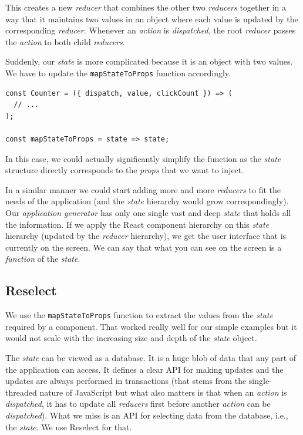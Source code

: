 This creates a new \emph{reducer} that combines the other two \emph{reducers} together in a way that it maintains two values in an object where each value is updated by the corresponding \emph{reducer}. Whenever an \emph{action} is \emph{dispatched}, the root \emph{reducer} passes the \emph{action} to both child \emph{reducers}.

Suddenly, our \emph{state} is more complicated because it is an object with two values. We have to update the \texttt{mapStateToProps} function accordingly.

\begin{verbatim}
const Counter = ({ dispatch, value, clickCount }) => (
  // ...
);

const mapStateToProps = state => state;
\end{verbatim}

In this case, we could actually significantly simplify the function as the \emph{state} structure directly corresponds to the \emph{props} that we want to inject.

In a similar manner we could start adding more and more \emph{reducers} to fit the needs of the application (and the \emph{state} hierarchy would grow correspondingly). Our \emph{application generator} has only one single vast and deep \emph{state} that holds all the information. If we apply the React component hierarchy on this \emph{state} hierarchy (updated by the \emph{reducer} hierarchy), we get the user interface that is currently on the screen.  We can say that what you can see on the screen is a \emph{function} of the \emph{state}.

\subsection{Reselect}

We use the \texttt{mapStateToProps} function to extract the values from the \emph{state} required by a component. That worked really well for our simple examples but  it would not scale with the increasing size and depth of the \emph{state} object.


The \emph{state} can be viewed as a database. It is a huge blob of data that any part of the application can access. It defines a clear API for making updates and the updates are always performed in transactions (that stems from the single-threaded nature of JavaScript but what also matters is that when an \emph{action} is \emph{dispatched}, it has to update all \emph{reducers} first before another \emph{action} can be \emph{dispatched}). What we miss is an API for selecting data from the database, i.e., the \emph{state}. We use Reselect for that.

